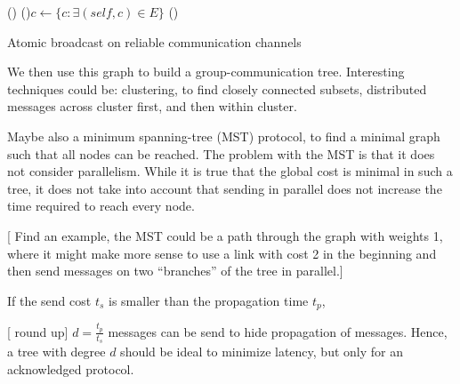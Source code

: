 \documentclass{article}
\newcommand{\stefan}[1]{
  {\color{skRed}[{\color{red}{SK}} #1]}}
\begin{document}
\newcommand{\textc}[1]{{\color{gray} {\footnotesize #1}}}
\begin{algorithm}[H]
%
%
%
%
%
%
%
  \BlankLine
  \Fn(){}{
    \For(){$c \leftarrow \{ c: \exists (self, c) \in E \} $}{
    }
    \waitchild{}\;
    \;
  }
  \BlankLine
  \Fn(){}{
  }
  \caption{Atomic broadcast on reliable communication channels}
  \label{algo:ab}
\end{algorithm}

We then use this graph to build a group-communication
tree. Interesting techniques could be: clustering, to find closely
connected subsets, distributed messages across cluster first, and then
within cluster. 

Maybe also a minimum spanning-tree (MST) protocol, to find a minimal
graph such that all nodes can be reached. The problem with the MST is
that it does not consider parallelism. While it is true that the
global cost is minimal in such a tree, it does not take into account
that sending in parallel does not increase the time required to reach
every node. %
\stefan{Find an example, the MST could be a path through the graph
  with weights 1, where it might make more sense to use a link with
  cost 2 in the beginning and then send messages on two ``branches''
  of the tree in parallel.}

If the send cost $t_s$ is smaller than the propagation time $t_p$,
\stefan{round up}%
$d = \frac{t_p}{t_s}$ messages can be send to hide propagation of
messages. Hence, a tree with degree $d$ should be ideal to minimize
latency, but only for an acknowledged protocol.
\end{document}
